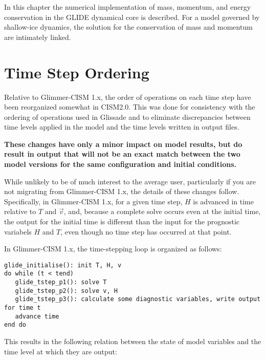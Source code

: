\label{ch:glide}

In this chapter the numerical implementation of mass, momentum, and energy conservation in the GLIDE dynamical core is described. For a model governed by shallow-ice dynamics, the solution for the conservation of mass and momentum are intimately linked.








\section{Time Step Ordering}

Relative to Glimmer-CISM 1.x, the order of operations on each time step have been
reorganized somewhat in CISM2.0.  This was done for consistency with the ordering
of operations used in Glissade and to eliminate discrepancies between time levels
applied in the model and the time levels written in output files.  

\textbf{These changes have only a minor impact on model results, but do result 
in output that will not be an exact match between the two model versions for the
same configuration and initial conditions.}

While unlikely to be of much interest to the average user, particularly if you are not
migrating from Glimmer-CISM 1.x, the details of these changes follow.
Specifically, in Glimmer-CISM 1.x, for a given time step, $H$ is advanced in time
relative to $T$ and $\vec{v}$, and, because a complete solve occurs even at the 
initial time, the output for the initial time is different than the input for 
the prognostic variabels $H$ and $T$, even though no time step has occurred at 
that point.

In Glimmer-CISM 1.x, the time-stepping loop is organized as follows:
\begin{verbatim}
glide_initialise(): init T, H, v
do while (t < tend)
   glide_tstep_p1(): solve T
   glide_tstep_p2(): solve v, H
   glide_tstep_p3(): calculate some diagnostic variables, write output for time t
   advance time
end do
\end{verbatim}

\noindent This results in the following relation between the state of model variables and
the time level at which they are output:

